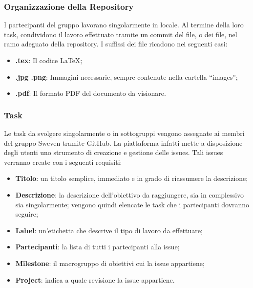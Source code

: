 \subsubsection{Organizzazione della Repository}
I partecipanti del gruppo lavorano singolarmente in locale. Al termine della loro task, condividono 
il lavoro effettuato tramite un commit del file, o dei file, nel ramo adeguato della repository.
I suffissi dei file ricadono nei seguenti casi:
\begin{itemize}
    \item \textbf{.tex}: Il codice \LaTeX;
    \item \textbf{.jpg .png}: Immagini necessarie, sempre contenute nella cartella ``images'';
    \item \textbf{.pdf}: Il formato PDF del documento da visionare.
\end{itemize}
\subsubsection{Task}
Le task da svolgere singolarmente o in sottogruppi vengono assegnate ai membri del gruppo Sweven tramite
GitHub. La piattaforma infatti mette a disposizione degli utenti uno strumento di creazione e gestione delle 
issues. Tali issues verranno create con i seguenti requisiti:
\begin{itemize}
    \item \textbf{Titolo}: un titolo semplice, immediato e in grado di riassumere la descrizione;
    \item \textbf{Descrizione}: la descrizione dell'obiettivo da raggiungere, sia in complessivo sia singolarmente; 
                                vengono quindi elencate le task che i partecipanti dovranno seguire;
    \item \textbf{Label}: un'etichetta che descrive il tipo di lavoro da effettuare;
    \item \textbf{Partecipanti}: la lista di tutti i partecipanti alla issue;
    \item \textbf{Milestone}: il macrogruppo di obiettivi cui la issue appartiene;
    \item \textbf{Project}: indica a quale revisione la issue appartiene.
\end{itemize}
